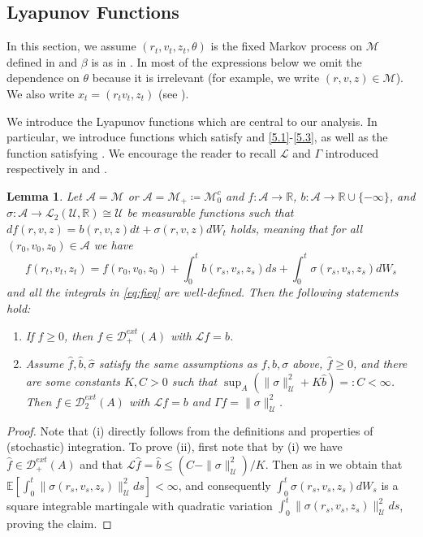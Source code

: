 \documentclass[final]{amsart}
\newtheorem{lem}[thm]{Lemma}
\numberwithin{thm}{section}
\numberwithin{equation}{section}
\newcommand{\E}{\mathbb{E}}
\newcommand{\U}{\mathcal{U}}
\newcommand{\mcM}{\mathcal{M}}
\newcommand{\R}{\mathbb{R}}
\newcommand{\inv}{\mathcal{M}_+}
\newcommand{\Dme}{\mathcal{D}^{ext}}
\newcommand{\Ll}{\mathcal{L}}
\begin{document}
\subsection{Lyapunov Functions}\label{sec:SPDE-lyap}
In this section, we assume $(r_t,v_t,z_t,\theta)$ is the fixed Markov process on $\mcM$ defined in  and $\beta$ is as in . In most of the expressions below we omit the dependence on $\theta$ because it is irrelevant (for example, we write $(r,v,z) \in \mcM$). We also write $x_t = (r_tv_t,z_t)$ (see ).

We introduce the Lyapunov functions which are central to our analysis. In particular, we introduce functions which satisfy  and \ref{5.1}-\ref{5.3}, as well as the function satisfying . We encourage the reader to recall $\Ll$ and $\Gamma$ 
introduced respectively in  and .
 
\begin{lem}\label{generator-for-SPDE}
    Let $\mathcal{A} = \mcM$ or $\mathcal{A} = \inv \coloneqq \mcM_0^c$ and $f: \mathcal{A} \to \R$, $b: \mathcal{A} \to \R \cup \{-\infty\}$, and $\sigma: \mathcal{A} \to \Ll_2(\U, \R) \cong \U$ be measurable functions such that $df(r,v,z) = b(r,v,z)dt + \sigma(r,v,z) dW_t$ holds, meaning that for all $(r_0,v_0,z_0) \in \mathcal{A}$ 
    we have 
    \begin{equation}\label{eq:fieq}
        f(r_t,v_t,z_t) = f(r_0,v_0,z_0) + \int_0^t b(r_s,v_s,z_s)ds + \int_0^t \sigma(r_s,v_s,z_s)dW_s
    \end{equation}
    and all the integrals in \eqref{eq:fieq} are well-defined. Then the following statements hold:

    \begin{enumerate}[label = (\roman*)]
        \item If $f \geq 0$, then $f \in \Dme_+(A)$ with $\Ll f = b$.
        \item Assume $\hat f, \hat b, \hat \sigma$ satisfy the same assumptions as $f,  b,  \sigma$
        above, $\hat f \geq 0$, and there are some constants $K, C > 0$ such that $\sup_A (\|\sigma\|_\U^2 + K \hat b) =: C < \infty$. Then $f \in \Dme_2(A)$ with $\Ll f = b$ and $\Gamma f = \|\sigma\|_\U^2$.
    \end{enumerate}
\end{lem}

\begin{proof}
   Note that (i) directly follows from the definitions and properties of (stochastic) integration. To prove (ii), first note that by 
   (i) we have $\hat f \in \Dme_+(A)$ and that $\Ll \hat f = \hat b \leq (C - \|\sigma\|_\U^2)/K$. Then as in  \cite[Lemma 4.1]{extinction} we obtain that $\E[\int_0^t \|\sigma(r_s,v_s,z_s)\|_\U^2ds] < \infty$, and consequently $\int_0^t \sigma(r_s,v_s,z_s)dW_s$ is a square integrable martingale with quadratic variation $\int_0^t \|\sigma(r_s,v_s,z_s)\|_\U^2ds$, proving the claim.
\end{proof}
\end{document}
